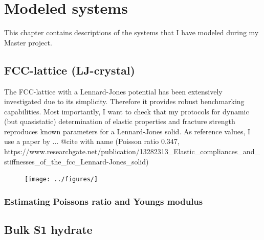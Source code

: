 
\chapter{Modeled systems}
This chapter contains descriptions of the systems that I have modeled during my Master project. 

\section{FCC-lattice (LJ-crystal)}
The FCC-lattice with a Lennard-Jones potential has been extensively investigated due to its simplicity. Therefore it provides robust benchmarking capabilities. Most importantly, I want to check that my protocols for dynamic (but quasistatic) determination of elastic properties and fracture strength reproduces known parameters for a Lennard-Jones solid. As reference values, I use a paper by ... @cite with name
(Poisson ratio 0.347, https://www.researchgate.net/publication/13282313\_Elastic\_compliances\_and\_stiffnesses\_of\_the\_fcc\_Lennard-Jones\_solid)

\begin{figure}
\texttt{[image: ../figures/]}
\end{figure}

\subsection{Estimating Poissons ratio and Youngs modulus}

\section{Bulk S1 hydrate}

